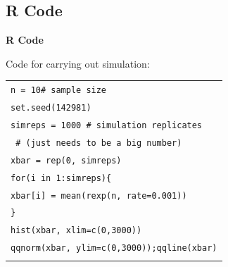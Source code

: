 \documentclass[compress]{beamer}        %
\makeatletter
\newcommand{\tcb}{\textcolor{beamer@blendedblue}}
\makeatother
\begin{document}
\subsection{R Code}
\begin{frame}{\bf \tcb{R Code}}

Code for carrying out simulation:\\[0.4cm]

\begin{tabular}{|l|}
\hline
\texttt{n = 10\quad\# sample size}\\[0.3cm]
\texttt{set.seed(142981)}\\[0.3cm]
\texttt{simreps = 1000 \quad\# simulation replicates}\\
\texttt{\phantom{simreps = 1000} \quad\# (just needs to be a big number)}\\
\texttt{xbar = rep(0, simreps)}\\[0.3cm]
\texttt{for(i in 1:simreps)\{}\\
\texttt{\qquad xbar[i] = mean(rexp(n, rate=0.001))}\\
\texttt{\}}\\[0.3cm]
\texttt{hist(xbar, xlim=c(0,3000))}\\[0.3cm]
\texttt{qqnorm(xbar, ylim=c(0,3000));qqline(xbar)}\\
\hline
\multicolumn{1}{c}{}\\[0.0cm]
\end{tabular}

\end{frame}
\end{document}
